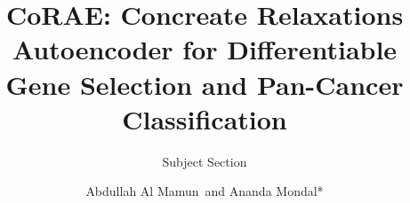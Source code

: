 \documentclass{bioinfo}
\begin{document}

\subtitle{Subject Section}

\title[short Title]{
CoRAE: Concreate Relaxations Autoencoder for Differentiable Gene Selection and Pan-Cancer Classification
}
\author[Sample \textit{et~al}.]{Abdullah Al Mamun\, and Ananda Mondal*}

\address
{
School of Computing and Information Sciences, Miami, US \\
}



\end{document}
